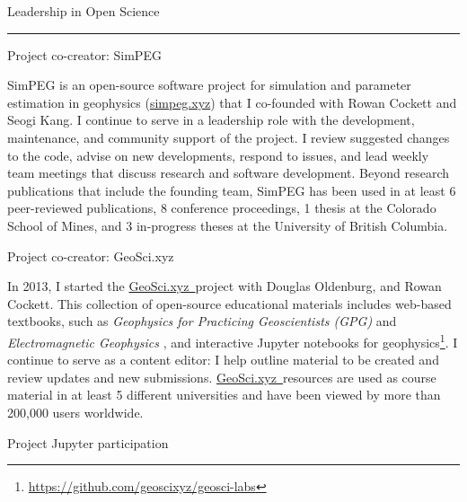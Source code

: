 \documentclass[a4paper, 11pt]{article}
\newcommand{\gpg}{\href{https://gpg.geosci.xyz}{https://gpg.geosci.xyz}}
\newcommand{\emgeosci}{\href{https://em.geosci.xyz}{https://em.geosci.xyz}}
\newcommand{\GeoSci}{\href{https://geosci.xyz}{GeoSci.xyz~}}
\newcommand{\heading}[1]{
    \begin{minipage}[t]{\textwidth}
    \vspace{0.05cm}
    {\LARGE #1}\\
    \vspace{-0.24cm}
    \hrule
    \end{minipage}
    \vspace{0.05cm}

}
\newcommand{\subheading}[1]{
    \vspace{0.4cm}
    {\Large #1}\\
    \vspace{-0.2cm}
}
\begin{document}
\heading{Leadership in Open Science}
\subheading{Project co-creator: SimPEG}

SimPEG is an open-source software project for simulation and parameter estimation in geophysics (\href{https://simpeg.xyz}{simpeg.xyz}) that I co-founded with Rowan Cockett and Seogi Kang. I continue to serve in a leadership role with the development, maintenance, and community support of the project. I review suggested changes to the code, advise on new developments, respond to issues, and lead weekly team meetings that discuss research and software development. Beyond research publications that include the founding team, SimPEG has been used in at least 6 peer-reviewed publications, 8 conference proceedings, 1 thesis at the Colorado School of Mines, and 3 in-progress theses at the University of British Columbia.


\subheading{Project co-creator: GeoSci.xyz}

In 2013, I started the \GeoSci project with Douglas Oldenburg, and Rowan Cockett. This collection of open-source educational materials includes web-based textbooks, such as \emph{Geophysics for Practicing Geoscientists (GPG)}
and \emph{Electromagnetic Geophysics}
, and interactive Jupyter notebooks for geophysics\footnote{\href{https://github.com/geoscixyz/geosci-labs}{https://github.com/geoscixyz/geosci-labs}}. I continue to serve as a content editor: I help outline material to be created and review updates and new submissions. \GeoSci resources are used as course material in at least 5 different universities and have been viewed by more than 200,000 users worldwide.

\subheading{Project Jupyter participation}
\end{document}
